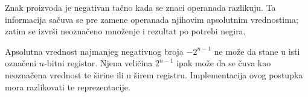 Znak proizvoda je negativan tačno kada se znaci operanada razlikuju. Ta informacija sačuva se pre zamene operanada njihovim apsolutnim vrednostima; zatim se izvrši neoznačeno množenje i rezultat po potrebi negira.

Apsolutna vrednost najmanjeg negativnog broja $-2^{n-1}$ ne može da stane u isti označeni $n$-bitni registar. Njena veličina $2^{n-1}$ ipak može da se čuva kao neoznačena vrednost te širine ili u širem registru. Implementacija ovog postupka mora razlikovati te reprezentacije.
